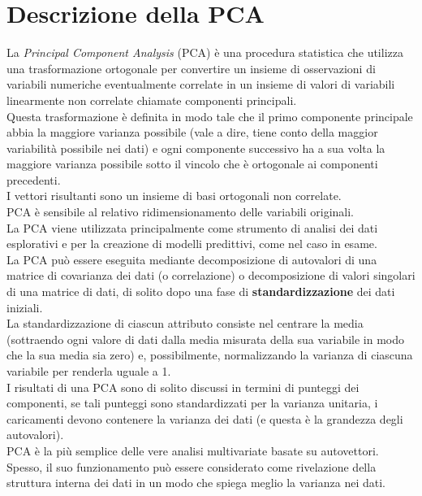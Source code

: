 \newpage




\section{Descrizione della PCA} 
La \textit{Principal Component Analysis} (PCA) è una procedura statistica che utilizza una trasformazione ortogonale per convertire un insieme di osservazioni di variabili numeriche eventualmente correlate in un insieme di valori di variabili linearmente non correlate chiamate componenti principali. \\ Questa trasformazione è definita in modo tale che il primo componente principale abbia la maggiore varianza possibile (vale a dire, tiene conto della maggior variabilità possibile nei dati) e ogni componente successivo ha a sua volta la maggiore varianza possibile sotto il vincolo che è ortogonale ai componenti precedenti. \\I vettori risultanti sono un insieme di basi ortogonali non correlate. \\PCA è sensibile al relativo ridimensionamento delle variabili originali.\\
La PCA viene utilizzata principalmente come strumento di analisi dei dati esplorativi e per la creazione di modelli predittivi, come nel caso in esame. \\La PCA può essere eseguita mediante decomposizione di autovalori di una matrice di covarianza dei dati (o correlazione) o decomposizione di valori singolari di una matrice di dati, di solito dopo una fase di \textbf{standardizzazione} dei dati iniziali. \\La standardizzazione di ciascun attributo consiste nel centrare la media (sottraendo ogni valore di dati dalla media misurata della sua variabile in modo che la sua media sia zero) e, possibilmente, normalizzando la varianza di ciascuna variabile per renderla uguale a 1.\\
I risultati di una PCA sono di solito discussi in termini di punteggi dei componenti, se tali punteggi sono standardizzati per la varianza unitaria, i caricamenti devono contenere la varianza dei dati (e questa è la grandezza degli autovalori).\\
PCA è la più semplice delle vere analisi multivariate basate su autovettori.\\ Spesso, il suo funzionamento può essere considerato come rivelazione della struttura interna dei dati in un modo che spiega meglio la varianza nei dati.

